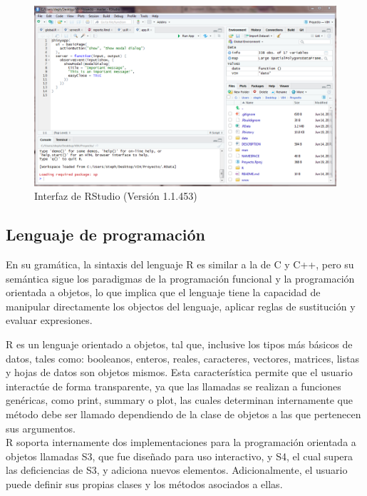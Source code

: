 \begin{figure}[H]
\centering
\includegraphics[scale=0.4]{RStudio.PNG}
\caption{Interfaz de RStudio (Versi\'on 1.1.453)}
\end{figure}

\subsection{Lenguaje de programaci\'on}

En su gram\'atica, la sintaxis del lenguaje R es similar a la de C y C++, pero su sem\'antica sigue los paradigmas de la programaci\'on funcional y la programaci\'on orientada a objetos, lo que implica que el lenguaje tiene la capacidad de manipular directamente los objectos del lenguaje, aplicar reglas de sustituci\'on y evaluar expresiones. \citet{grun}

R es un lenguaje orientado a objetos, tal que, inclusive los tipos m\'as b\'asicos de datos, tales como: booleanos, enteros, reales, caracteres, vectores, matrices, listas y hojas de datos son objetos mismos. Esta caracter\'istica permite que el usuario interact\'ue de forma transparente, ya que las llamadas se realizan a funciones gen\'ericas, como print, summary o plot, las cuales determinan internamente que m\'etodo debe ser llamado dependiendo de la clase de objetos a las que pertenecen sus argumentos. \\

R soporta internamente dos implementaciones para la programaci\'on orientada a objetos llamadas S3, que fue diseñado para uso interactivo, y S4, el cual supera las deficiencias de S3, y adiciona nuevos elementos. Adicionalmente, el usuario puede definir sus propias clases y los m\'etodos asociados a ellas.\\


